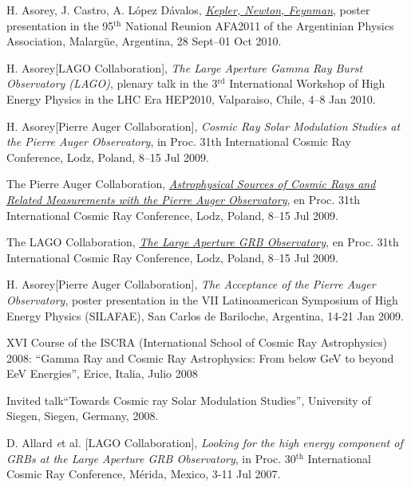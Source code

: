 \documentclass[11pt, a4paper]{article}
\newcommand{\years}[1]{\marginnote{\scriptsize #1}}
\begin{document}
\begin{etaremune}
\item \years{2010}H. Asorey, J. Castro, A. López Dávalos,
\href{http://95rnf.afa.webfactional.com/tex\_files/Resumenes/EF/asorey.pdf}{\emph{Kepler,
Newton, Feynman}}, poster presentation in the 95$^{\mathrm{th}}$ National Reunion AFA2011 of
the Argentinian Physics Association, Malargüe, Argentina, 28 Sept--01 Oct 2010.

\item \years{2010}H. Asorey[LAGO Collaboration], {\emph{The Large Aperture Gamma Ray
Burst Observatory (LAGO)}}, plenary talk in the 3$^{\mathrm{rd}}$ International Workshop of
High Energy Physics in the LHC Era HEP2010, Valparaiso, Chile, 4--8 Jan 2010.

\item \years{2009}H. Asorey[Pierre Auger Collaboration], {\emph{Cosmic Ray Solar
Modulation Studies at the Pierre Auger Observatory}}, in Proc. 31th
International Cosmic Ray Conference, Lodz, Poland, 8--15 Jul 2009.

\item \years{2009}The Pierre Auger Collaboration,
\href{http://arxiv.org/abs/0906.2347}{\emph{Astrophysical Sources of Cosmic
Rays and Related Measurements with the Pierre Auger Observatory}}, en Proc.
31th International Cosmic Ray Conference, Lodz, Poland, 8--15 Jul 2009.

\item \years{2009}The LAGO Collaboration,
\href{http://arxiv.org/abs/0906.0816}{\emph{The Large Aperture GRB
Observatory}}, en Proc. 31th International Cosmic Ray Conference, Lodz,
Poland, 8--15 Jul 2009.

\item \years{2009}H. Asorey[Pierre Auger Collaboration], {\emph{The Acceptance of the
Pierre Auger Observatory}}, poster presentation in the VII Latinoamerican
Symposium of High Energy Physics (SILAFAE), San Carlos de Bariloche, Argentina,
14-21 Jan 2009.

\item \years{2008}XVI Course of the ISCRA (International School of Cosmic Ray
Astrophysics) 2008: ``Gamma Ray and Cosmic Ray Astrophysics: From below GeV to
beyond EeV Energies'', Erice, Italia, Julio 2008

\item \years{2008} Invited talk``Towards Cosmic ray Solar Modulation Studies'',
University of Siegen, Siegen, Germany, 2008.

\item \years{2007}D. Allard {\emph et al.} [LAGO Collaboration], {\emph{Looking for
the high energy component of GRBs at the Large Aperture GRB Observatory}}, in
Proc. 30$^{\mathrm{th}}$ International Cosmic Ray Conference,  Mérida, Mexico, 3-11 Jul
2007.


\end{etaremune}
\end{document}
